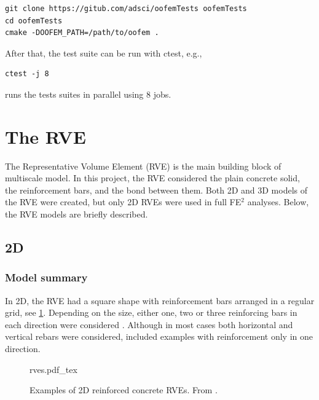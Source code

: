 \documentclass[11pt]{article}
\begin{document}
\begin{lstlisting}[style=oofem]
git clone https://gitub.com/adsci/oofemTests oofemTests
cd oofemTests
cmake -DOOFEM_PATH=/path/to/oofem .
\end{lstlisting}


\noindent After that, the test suite can be run with ctest, e.g.,
\begin{lstlisting}[style=oofem]
ctest -j 8
\end{lstlisting}
\noindent runs the tests suites in parallel using 8 jobs.

\clearpage
\section{The RVE}

The Representative Volume Element (RVE) is the main building block of multiscale model. In this project, the RVE considered the plain concrete solid, the reinforcement bars, and the bond between them. 
Both 2D and 3D models of the RVE were created, but only 2D RVEs were used in full FE$^2$ analyses.
Below, the RVE models are briefly described.

\subsection{2D}
\subsubsection{Model summary}
In 2D, the RVE had a square shape with reinforcement bars arranged in a regular grid, see \cref{s}.
Depending on the size, either one, two or three reinforcing bars in each direction were considered \cite{PaperA,PaperB,PaperC}. Although in most cases both horizontal and vertical rebars were considered, \cite{Sciegaj2019semc} included examples with reinforcement only in one direction.

\begin{figure}[H]
    \centering
\def\svgwidth{0.6\textwidth}
{rves.pdf_tex}
\caption{Examples of 2D reinforced concrete RVEs. From \cite{PaperA}.}
\label{s}
\end{figure}
\end{document}
